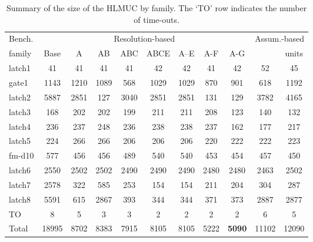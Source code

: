 \documentclass[twoside,11pt]{article}
\begin{document}
\begin{table}
\begin{center}
\begin{tabular}{|l|c|c|c|c|c|c|c|c|c|c|}\hline
Bench.	& \multicolumn{8}{c|}{Resolution-based}	&        \multicolumn{2}{c|}{Assum.-based} \\ \cline{2-11}
family	&  Base		&    A		&  AB    		&  ABC   		&  ABCE  		& A--E	& A-F	& A-G	 &  &  units	 \\ \hline
latch1      &  41		&  41		&  41		&  41		&  42		&  42		&  41		& 42	&  52		&   45	\\
gate1	    &  1143		&  1210		&  1089		&  568		&  1029		&  1029		&  870		& 901	&  618		&   1192	\\
latch2    	&  5887		&  2851		&  127		&  3040		&  2851		&  2851		&  131		& 129	&  3782		&   4165	\\
latch3      &  168		&  202		&  202		&  199		&  211		&  211		&  208		& 123	&  140		&   132	\\
latch4 		&  236		&  237		&  248		&  236		&  238		&  238		&  237		& 162	&  177		&   217	 \\
latch5 		&  224		&  266		&  266		&  206		&  206		&  206		&  220		& 222	&  222		&   223	 \\
fm-d10	&  577		&  456		&  456		&  489		&  540		&  540		&  453		& 454	&  457		&   450	 \\
latch6      &  2550		&  2502		&  2502		&  2490		&  2490		&  2490		&  2480		& 2480	&  2463		&   2502	\\
latch7	    &  2578		&  322		&  585		&  253		&  154		&  154		&  211		& 204	&  304		&   287	\\
latch8      &  5591		&  615		&  2867		&  393		&  344		&  344		&  371		& 373	&  2887		&   2877	\\ \hline
TO          & 8         & 5	        & 3	        & 3         & 2         & 2         & 2         & 2     & 6         & 5 \\ \hline
Total	    &  18995	&  8702		&  8383		&  7915		&  8105		&  8105		&  5222		& {\bf 5090}& 11102 &   12090	\\ \hline

\end{tabular}
\vspace{0.1 cm} \caption{Summary of the size of the HLMUC by family. The `TO'
row indicates the number of time-outs.}\label{ta:2}
\end{center}
\end{table}
\end{document}
